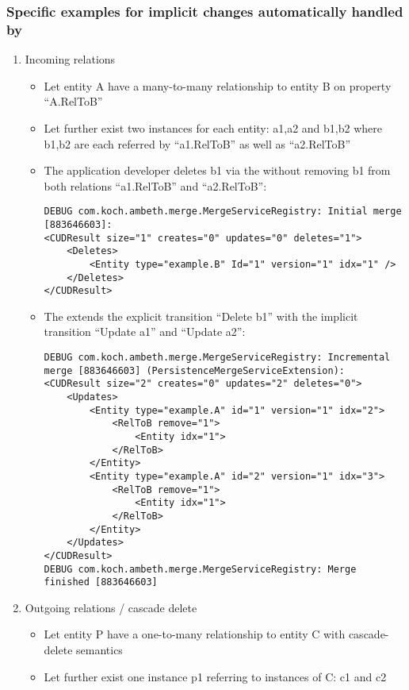 \subsubsection{Specific examples for implicit changes automatically handled by \AMBETH{}}
\begin{enumerate}
	\item Incoming relations
		\begin{itemize}
			\item Let entity A have a many-to-many relationship to entity B on property ``A.RelToB''
			\item Let further exist two instances for each entity: a1,a2 and b1,b2 where b1,b2 are each referred by ``a1.RelToB'' as well as ``a2.RelToB''
			\item The application developer deletes b1 via the \AMBETH{}  without removing b1 from both relations ``a1.RelToB'' and ``a2.RelToB'':
\begin{lstlisting}[style=POM]
DEBUG com.koch.ambeth.merge.MergeServiceRegistry: Initial merge [883646603]:
<CUDResult size="1" creates="0" updates="0" deletes="1">
	<Deletes>
		<Entity type="example.B" Id="1" version="1" idx="1" />
	</Deletes>
</CUDResult>
\end{lstlisting}
			\item The  extends the explicit transition ``Delete b1'' with the implicit transition ``Update a1'' and ``Update a2'':
\begin{lstlisting}[style=POM]		
DEBUG com.koch.ambeth.merge.MergeServiceRegistry: Incremental merge [883646603] (PersistenceMergeServiceExtension):
<CUDResult size="2" creates="0" updates="2" deletes="0">
	<Updates>
		<Entity type="example.A" id="1" version="1" idx="2">
			<RelToB remove="1">
				<Entity idx="1">
			</RelToB>
		</Entity>
		<Entity type="example.A" id="2" version="1" idx="3">
			<RelToB remove="1">
				<Entity idx="1">
			</RelToB>
		</Entity>
	</Updates>
</CUDResult>
DEBUG com.koch.ambeth.merge.MergeServiceRegistry: Merge finished [883646603]
\end{lstlisting}
		\end{itemize}
	\item Outgoing relations / cascade delete
		\begin{itemize}
			\item	Let entity P have a one-to-many relationship to entity C with cascade-delete semantics
			\item Let further exist one instance p1 referring to instances of C: c1 and c2

\end{itemize}
\end{enumerate}
